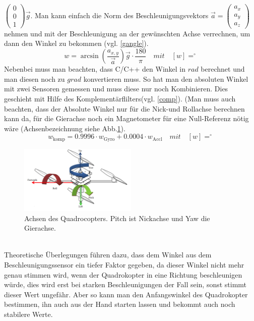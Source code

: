 \documentclass[12pt,a4paper, ngerman]{article}
\begin{document}
$
\begin{pmatrix}
0\\ 
0\\ 
1
\end{pmatrix}
\vec{g}
$. Man kann einfach die Norm des Beschleunigungsvektors $\vec{a} = \begin{pmatrix}
a_{x}\\ 
a_{y}\\ 
a_{z}
\end{pmatrix}$ nehmen und mit der Beschleunigung an der gewünschten Achse verrechnen, um dann den Winkel zu bekommen (vgl. \ref{gangle}).
\begin{equation}\label{gangle}
w=\arcsin(\frac{a_{x,y}}{\vec{a}}
)
\vec{g}\cdot \frac{180}{\pi} \quad mit \quad [w]=^\circ
\end{equation}
Nebenbei muss man beachten, dass C/C++ den Winkel in $rad$ berechnet und man diesen noch zu $grad$ konvertieren muss. So hat man den absoluten Winkel mit zwei Sensoren gemessen und muss diese nur noch Kombinieren. Dies geschieht mit Hilfe des Komplementärflilters(vgl. \ref{comp}). (Man muss auch beachten, dass der Absolute Winkel nur für die Nick-und Rollachse berechnen kann da, für die Gierachse noch ein Magnetometer für eine Null-Referenz nötig wäre (Achsenbezeichnung siehe Abb.\ref{ypr}).
\begin{equation}\label{comp}
w_{\text{komp}}=0.9996\cdot w_{\text{Gyro}}+0.0004\cdot w_{\text{Accl}} \quad mit \quad [w]=^\circ
\end{equation}
\begin{figure}[h!]
\centering
\includegraphics[width=0.5\textwidth]{ypr.png}
\caption[\url{https://technikblog.ch/wp-content/uploads/2013/03/Roll-Pitch-_Yaq-Quadcopter.png}]{Achsen des Quadrocopters. Pitch ist Nickachse und Yaw die Gierachse.}\label{ypr}
\end{figure} \\
Theoretische Überlegungen führen dazu, dass dem Winkel aus dem Beschleunigungssensor ein tiefer Faktor gegeben, da dieser Winkel nicht mehr genau stimmen wird, wenn der Quadrokopter in eine Richtung beschleunigen würde, dies wird erst bei starken Beschleunigungen der Fall sein, sonst stimmt dieser Wert ungefähr. Aber so kann man den Anfangswinkel des Quadrokopter bestimmen, ihn auch aus der Hand starten lassen und bekommt auch noch stabilere Werte.\\ \\
\end{document}
